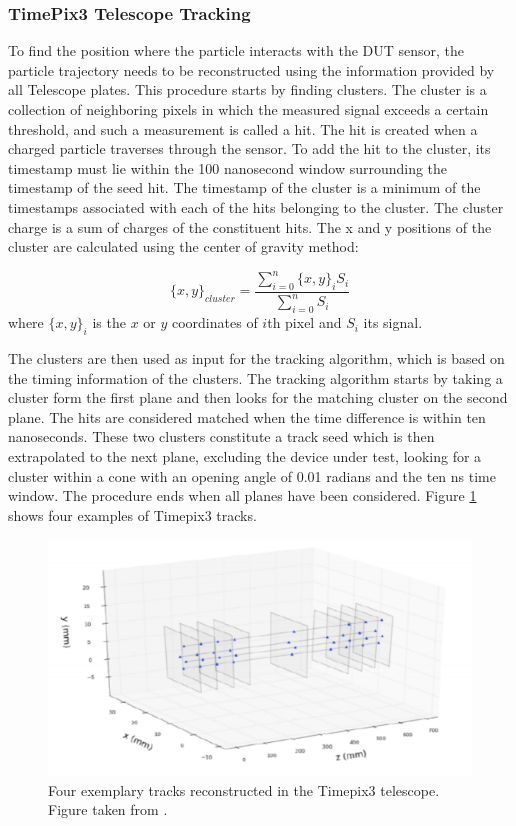 \subsubsection{TimePix3 Telescope Tracking}

To find the position where the particle interacts with the DUT sensor, the particle trajectory needs to be reconstructed using the information provided by all Telescope plates. This procedure starts by finding clusters. The cluster is a collection of neighboring pixels in which the measured signal exceeds a certain threshold, and such a measurement is called a hit. The hit is created when a charged particle traverses through the sensor.  To add the hit to the cluster, its timestamp must lie within the 100 nanosecond window surrounding the timestamp of the seed hit. The timestamp of the cluster is a minimum of the timestamps associated with each of the hits belonging to the cluster. The cluster charge is a sum of charges of the constituent hits. 
The x and y positions of the cluster are calculated using the center of gravity method: 

\begin{equation}
    \{x,y\}_{cluster} = \frac{\sum_{i = 0}^{n} \{x,y\}_{i} S_{i}}{\sum_{i = 0}^{n} S_{i}} 
\end{equation}
where $\{x,y\}_{i} $ is the $x$ or $y$  coordinates of $i$th pixel and $S_i$ its signal. 

The clusters are then used as input for the tracking algorithm, which is based on the timing information of the clusters.  The tracking algorithm starts by taking a cluster form the first plane and then looks for the matching cluster on the second plane. The hits are considered matched when the time difference is within ten nanoseconds. These two clusters constitute a track seed which is then extrapolated to the next plane, excluding the device under test, looking for a cluster within a cone with an opening angle of 0.01 radians and the ten ns time window. The procedure ends when all planes have been considered. Figure \ref{fig:telescope_tracks} shows four examples of Timepix3 tracks. 



\begin{figure}
\centering
\includegraphics[scale=0.9]{figures/telescope_tracks.png}
\caption{Four exemplary tracks reconstructed in the Timepix3 telescope. Figure taken from \cite{Sophie}.}
\label{fig:telescope_tracks}
\end{figure}


